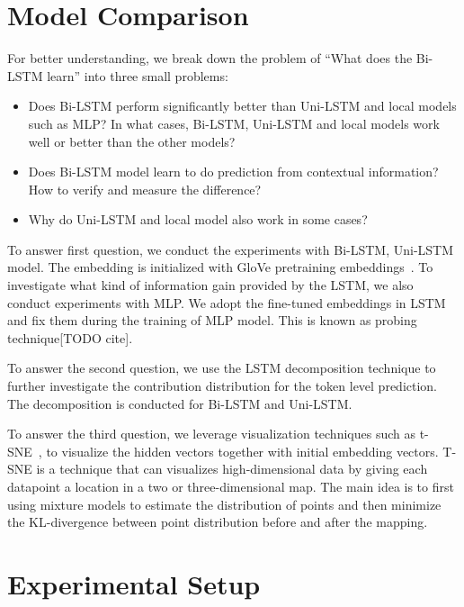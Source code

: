 \documentclass{article}
\begin{document}
\section{Model Comparison}

For better understanding, we break down the problem of ``What does the Bi-LSTM learn'' into three small problems:

\begin{itemize}
	\item Does Bi-LSTM perform significantly better than Uni-LSTM and local models such as MLP? 
	In what cases, Bi-LSTM, Uni-LSTM and local models work well or better than the other models?
	\item Does Bi-LSTM model learn to do prediction from contextual information? How to verify and measure the difference?
	\item Why do Uni-LSTM and local model also work in some cases? 
\end{itemize}

To answer first question, we conduct the experiments with Bi-LSTM, Uni-LSTM model. The embedding is initialized with GloVe pretraining embeddings~\cite{pennington2014glove}. To investigate what kind of information gain provided by the LSTM, we also conduct experiments with MLP. We adopt the fine-tuned embeddings in LSTM and fix them during the training of MLP model. This is known as probing technique[TODO cite]. 

To answer the second question, we use the LSTM decomposition technique to further investigate the contribution distribution for the token level prediction. The decomposition is conducted for Bi-LSTM and Uni-LSTM. 

To answer the third question, we leverage visualization techniques such as t-SNE~\cite{maaten2008visualizing}, to visualize the hidden vectors together with initial embedding vectors. T-SNE is a technique that can visualizes high-dimensional data by giving each datapoint a location in a two or three-dimensional map. The main idea is to first using mixture models to estimate the distribution of points and then minimize the KL-divergence between point distribution before and after the mapping.


\section{Experimental Setup}
\end{document}
